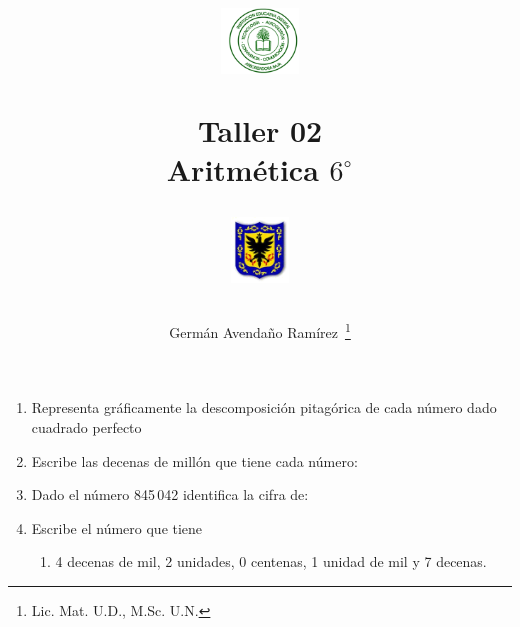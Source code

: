 \documentclass[10pt,twoside]{article}
\author{Germ\'an Avenda\~no Ram\'irez~\thanks{Lic. Mat. U.D., M.Sc. U.N.}}
\title{\begin{minipage}{.2\textwidth}
\includegraphics[height=1.75cm]{Images/logo-colegio.png}\end{minipage}
\begin{minipage}{.55\textwidth}
\begin{center}
Taller 02 \\
Aritmética $6^{\circ}$
\end{center}
\end{minipage}\hfill
\begin{minipage}{.2\textwidth}
\includegraphics[height=1.75cm]{Images/logo-sed.png} 
\end{minipage}}
\date{}
\begin{document}
\maketitle
\begin{enumerate}
\item Representa gráficamente la descomposición pitagórica de cada número dado cuadrado perfecto
\begin{enumerate}
\end{enumerate}
\item Escribe las decenas de millón que tiene cada número:
\begin{enumerate}
\end{enumerate}
\item Dado el número 845\,042 identifica la cifra de:
\begin{enumerate}
\end{enumerate}
\item Escribe el número que tiene
\begin{enumerate}
\item 4 decenas de mil, 2 unidades, 0 centenas, 1
unidad de mil y 7 decenas.

\end{enumerate}
\end{enumerate}
\end{document}
